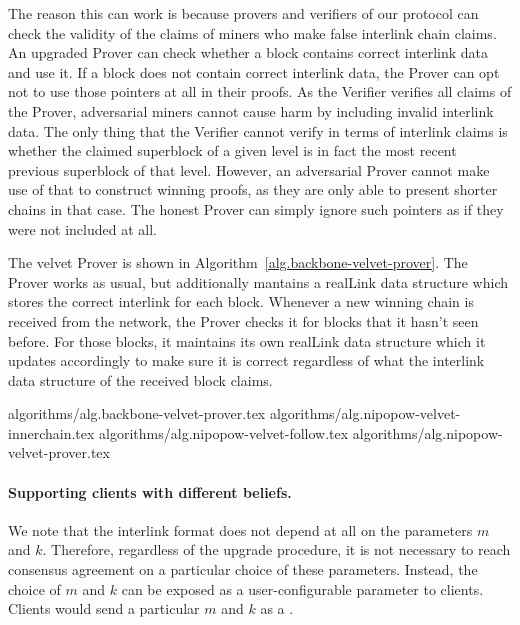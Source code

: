 The reason this can work is because provers and verifiers of our protocol can
check the validity of the claims of miners who make false interlink chain
claims. An upgraded Prover can check whether a block contains correct interlink
data and use it. If a block does not contain correct interlink data, the Prover
can opt not to use those pointers at all in their proofs. As the Verifier
verifies all claims of the Prover, adversarial miners cannot cause harm by
including invalid interlink data. The only thing that the Verifier cannot
verify in terms of interlink claims is whether the claimed superblock of a
given level is in fact the most recent previous superblock of that level.
However, an adversarial Prover cannot make use of that to construct winning
proofs, as they are only able to present shorter chains in that case. The
honest Prover can simply ignore such pointers as if they were not included at
all.

The velvet Prover is shown in Algorithm~\ref{alg.backbone-velvet-prover}. The
Prover works as usual, but additionally mantains a realLink data structure
which stores the correct interlink for each block. Whenever a new winning chain
is received from the network, the Prover checks it for blocks that it hasn't
seen before. For those blocks, it maintains its own realLink data structure
which it updates accordingly to make sure it is correct regardless of what the
interlink data structure of the received block claims.

{algorithms/alg.backbone-velvet-prover.tex}
{algorithms/alg.nipopow-velvet-innerchain.tex}
{algorithms/alg.nipopow-velvet-follow.tex}
{algorithms/alg.nipopow-velvet-prover.tex}

\paragraph{Supporting clients with different beliefs.}
We note that the interlink format does not depend at all on the parameters $m$ and $k$.
Therefore, regardless of the upgrade procedure, it is not necessary to reach consensus agreement on a particular choice of these parameters. Instead, the choice of $m$ and $k$ can be exposed as a user-configurable parameter to clients. Clients would send a particular $m$ and $k$ as a .

